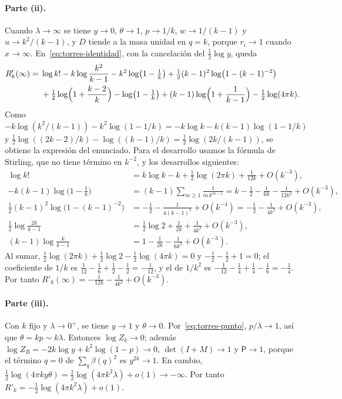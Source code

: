 \paragraph{Parte (ii).}
Cuando $\lambda\to\infty$ se tiene $y\to0$, $\theta\to1$, $p\to1/k$, $w\to1/(k-1)$ y $u\to k^2/(k-1)$, y $D$
tiende a la masa unidad en $q=k$, porque $r_i\to1$ cuando $x\to\infty$. En~\eqref{eq:torres-identidad}, con
la cancelación del $\frac12\log y$, queda
\[
\begin{aligned}
 R'_k(\infty)={}&\log k!-k\log\frac{k^2}{k-1}-k^2\log\bigl(1-\tfrac1k\bigr)
 +\tfrac12(k-1)^2\log\bigl(1-(k-1)^{-2}\bigr)\\
 &+\tfrac12\log\Bigl(1+\frac{k-2}k\Bigr)-\log\bigl(1-\tfrac1k\bigr)
 +(k-1)\log\Bigl(1+\frac1{k-1}\Bigr)-\tfrac12\log(4\pi k).
\end{aligned}
\]
Como $-k\log(k^2/(k-1))-k^2\log(1-1/k)=-k\log k-k(k-1)\log(1-1/k)$ y
$\frac12\log((2k-2)/k)-\log((k-1)/k)=\frac12\log(2k/(k-1))$, se obtiene la expresión del enunciado. Para el
desarrollo usamos la fórmula de Stirling, que no tiene término en $k^{-2}$, y los desarrollos siguientes:
\[
\begin{aligned}
 \log k!&=k\log k-k+\tfrac12\log(2\pi k)+\tfrac1{12k}+O(k^{-3}),\\
 -k(k-1)\log\bigl(1-\tfrac1k\bigr)&=(k-1)\sum_{m\ge1}\frac1{m\,k^{m-1}}
 =k-\tfrac12-\tfrac1{6k}-\tfrac1{12k^2}+O(k^{-3}),\\
 \tfrac12(k-1)^2\log\bigl(1-(k-1)^{-2}\bigr)&=-\tfrac12-\tfrac1{4(k-1)^2}+O(k^{-4})
 =-\tfrac12-\tfrac1{4k^2}+O(k^{-3}),\\
 \tfrac12\log\frac{2k}{k-1}&=\tfrac12\log2+\tfrac1{2k}+\tfrac1{4k^2}+O(k^{-3}),\\
 (k-1)\log\frac k{k-1}&=1-\tfrac1{2k}-\tfrac1{6k^2}+O(k^{-3}).
\end{aligned}
\]
Al sumar, $\frac12\log(2\pi k)+\frac12\log2-\frac12\log(4\pi k)=0$ y $-\frac12-\frac12+1=0$; el coeficiente
de $1/k$ es $\frac1{12}-\frac16+\frac12-\frac12=-\frac1{12}$, y el de $1/k^2$ es
$-\frac1{12}-\frac14+\frac14-\frac16=-\frac14$. Por tanto
$R'_k(\infty)=-\frac1{12k}-\frac1{4k^2}+O(k^{-3})$.

\paragraph{Parte (iii).}
Con $k$ fijo y $\lambda\to0^+$, se tiene $y\to1$ y $\theta\to0$. Por~\eqref{eq:torres-punto},
$p/\lambda\to1$, así que $\theta=kp\sim k\lambda$. Entonces $\log Z_k\to0$; además
$\log Z_B=-2k\log y+k^2\log(1-p)\to0$, $\det(I+M)\to1$ y $\mathsf P\to1$, porque el término $q=0$ de
$\sum_q\beta(q)^2$ es $y^{2k}\to1$. En cambio,
$\frac12\log(4\pi ky\theta)=\frac12\log(4\pi k^2\lambda)+o(1)\to-\infty$. Por tanto
$R'_k=-\frac12\log(4\pi k^2\lambda)+o(1)$.

